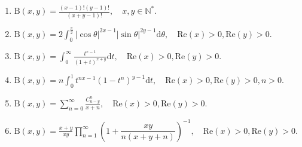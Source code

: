 \begin{property}
\begin{enumerate}[noitemsep]
\begin{enumerate}[noitemsep]
		\item $	\displaystyle  {\mathrm{B}\left(x,y\right)}= \frac{\left(x-1\right)!\left(y-1\right)!}{\left(x+y-1\right)!},\quad x,y \in \mathbb{N^*}.$
		
		\item $ \displaystyle  {\mathrm{B}\left(x,y\right)}= 2\int_0^{\frac{\pi}{2}} |\cos \theta|^{2x-1} |\sin \theta|^{2y-1} \mathrm{d} \theta,\quad \mathrm{Re}\left(x\right)>0,\mathrm{Re}\left(y\right)>0	.$
		
		\item 	$\displaystyle  {\mathrm{B}\left(x,y\right)}=  \int _{0}^{\infty }{\frac {t^{x-1}}{(1+t)^{x+y}}}\mathrm{d} t,\quad \mathrm{Re}\left(x\right)>0,\mathrm{Re}\left(y\right)>0.	$
		
		\item $\displaystyle 	{\mathrm{B}\left(x,y\right)}=  n\int _{0}^{1}t^{nx-1}(1-t^{n})^{y-1}\mathrm{d} t,\quad \mathrm{Re}\left(x\right)>0,\mathrm{Re}\left(y\right)>0,n>0.	$
		
		\item $\displaystyle {\mathrm{B}\left(x,y\right)}=  \sum _{n=0}^{\infty }{\frac {C^n_{n-y}}{x+n}},\quad \mathrm{Re}\left(x\right)>0,\mathrm{Re}\left(y\right)>0.
		$
		
		\item $\displaystyle \mathrm {B} (x,y)={\frac {x+y}{xy}}\prod _{n=1}^{\infty }\left(1+{\dfrac {xy}{n(x+y+n)}}\right)^{-1},\quad \mathrm{Re}\left(x\right)>0,\mathrm{Re}\left(y\right)>0.$
		
		\end{enumerate}
		

\end{enumerate}
\end{property}
